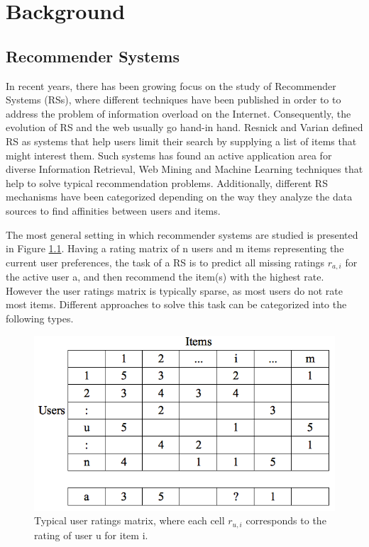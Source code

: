 \chapter{Background}
\label{sec:chapterlabel2}

\section{Recommender Systems}

In recent years, there has been growing focus on the study of Recommender Systems (RSs), where different techniques have been published in order to to address the problem of information overload on the Internet. Consequently, the evolution of RS and the web usually go hand-in hand. Resnick and Varian\cite{resnick1997recommender}  defined RS as systems that help users limit their search by supplying a list of items that might interest them. Such systems has found an active application area for diverse Information Retrieval, Web Mining and Machine Learning techniques that help to solve typical recommendation problems. Additionally,  different RS mechanisms have been categorized depending on the way they analyze the data sources to find affinities between users and items. 

The most general setting in which recommender systems are studied is presented in Figure \ref{fig:iomatrix}. Having a rating matrix of n users and m items representing the current user preferences, the task of a RS is to predict all missing ratings $r_{a,i}$ for the active user a, and then recommend the item(s) with the highest rate\cite{melville2011recommender}. However the user ratings matrix is typically sparse, as most users do not rate most items. Different approaches to solve this task can be categorized into the following types.

\begin{figure}[h]
\centering
\includegraphics[scale=0.9]{images/uimatrix}
\caption[Typical user rating matrix]{Typical user ratings matrix, where each cell $r_{u,i}$ corresponds to the rating of user u for item i.}
\label{fig:iomatrix}
\end{figure}

